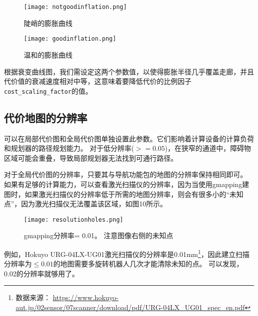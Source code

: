 
\begin{figure}[!htb]
	\begin{minipage}[t]{0.49\linewidth}
		\centering 
		\texttt{[image: notgoodinflation.png]} 
		\caption{陡峭的膨胀曲线} 
		\label{fig:side:a} 
	\end{minipage}%
	\begin{minipage}[t]{0.49\linewidth} 
		\centering 
		\texttt{[image: goodinflation.png]} 
		\caption{温和的膨胀曲线} 
		\label{fig:side:b} 
	\end{minipage} 
\end{figure}

根据衰变曲线图，我们需设定这两个参数值，以使得膨胀半径几乎覆盖走廊，并且代价值的衰减速度相对中等，这意味着要降低代价的比例因子\texttt{cost_scaling_factor}的值。

\subsection[costmap resolution]{代价地图的分辨率}%
可以在局部代价图和全局代价图单独设置此参数。它们影响着计算设备的计算负荷和规划器的路径规划能力。
对于低分辨率($>=0.05$)，在狭窄的通道中，障碍物区域可能会重叠，导致局部规划器无法找到可通行路径。

对于全局代价图的分辨率，只要其与导航功能包的地图的分辨率保持相同即可。
如果有足够的计算能力，可以查看激光扫描仪的分辨率，因为当使用gmapping建图时，如果激光扫描仪的分辨率低于所需的地图分辨率，则会有很多小的“未知点”，因为激光扫描仪无法覆盖该区域，如图10所示。


\begin{figure}[!h]
	\begin{center}
		\texttt{[image: resolutionholes.png]}
		\caption{gmapping分辨率= 0.01。 注意图像右侧的未知点}
	\end{center}
\end{figure}

例如，Hokuyo URG-04LX-UG01激光扫描仪的分辨率是0.01mm\footnote{数据来源： \url{https://www.hokuyo-aut.jp/02sensor/07scanner/download/pdf/URG-04LX_UG01_spec_en.pdf}}，因此建立扫描分辨率为$\leq 0.01$的地图需要多旋转机器人几次才能清除未知的点。
可以发现，0.02的分辨率就够用了。

